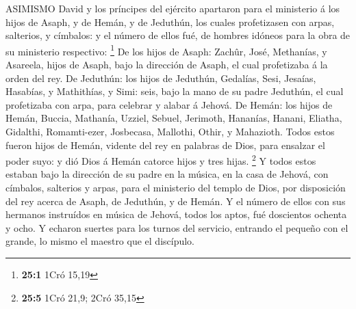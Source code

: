  ASIMISMO David y los príncipes del ejército apartaron para
el ministerio á los hijos de Asaph, y de Hemán, y de Jeduthún, los
cuales profetizasen con arpas, salterios, y címbalos: y el número de
ellos fué, de hombres idóneos para la obra de su ministerio respectivo:
\footnote{\textbf{25:1} 1Cró 15,19}  De los hijos de Asaph:
Zachûr, José, Methanías, y Asareela, hijos de Asaph, bajo la dirección
de Asaph, el cual profetizaba á la orden del rey.  De
Jeduthún: los hijos de Jeduthún, Gedalías, Sesi, Jesaías, Hasabías, y
Mathithías, y Simi: seis, bajo la mano de su padre Jeduthún, el cual
profetizaba con arpa, para celebrar y alabar á Jehová.  De
Hemán: los hijos de Hemán, Buccia, Mathanía, Uzziel, Sebuel, Jerimoth,
Hananías, Hanani, Eliatha, Gidalthi, Romamti-ezer, Josbecasa, Mallothi,
Othir, y Mahazioth.  Todos estos fueron hijos de Hemán,
vidente del rey en palabras de Dios, para ensalzar el poder suyo: y dió
Dios á Hemán catorce hijos y tres hijas. \footnote{\textbf{25:5} 1Cró
  21,9; 2Cró 35,15}  Y todos estos estaban bajo la dirección
de su padre en la música, en la casa de Jehová, con címbalos, salterios
y arpas, para el ministerio del templo de Dios, por disposición del rey
acerca de Asaph, de Jeduthún, y de Hemán.  Y el número de
ellos con sus hermanos instruídos en música de Jehová, todos los aptos,
fué doscientos ochenta y ocho.  Y echaron suertes para los
turnos del servicio, entrando el pequeño con el grande, lo mismo el
maestro que el discípulo.

